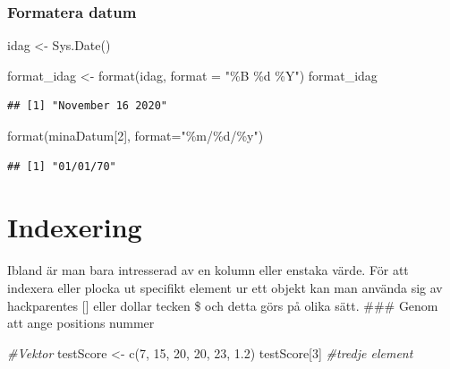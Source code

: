 \documentclass[
]{book}
\newenvironment{Shaded}{\begin{snugshade}}{\end{snugshade}}
\newcommand{\AttributeTok}[1]{\textcolor[rgb]{0.77,0.63,0.00}{#1}}
\newcommand{\CommentTok}[1]{\textcolor[rgb]{0.56,0.35,0.01}{\textit{#1}}}
\newcommand{\DecValTok}[1]{\textcolor[rgb]{0.00,0.00,0.81}{#1}}
\newcommand{\FloatTok}[1]{\textcolor[rgb]{0.00,0.00,0.81}{#1}}
\newcommand{\FunctionTok}[1]{\textcolor[rgb]{0.00,0.00,0.00}{#1}}
\newcommand{\NormalTok}[1]{#1}
\newcommand{\OtherTok}[1]{\textcolor[rgb]{0.56,0.35,0.01}{#1}}
\newcommand{\StringTok}[1]{\textcolor[rgb]{0.31,0.60,0.02}{#1}}
\begin{document}
\hypertarget{formatera-datum}{%
\subsubsection{Formatera datum}\label{formatera-datum}}

\begin{Shaded}
\begin{Highlighting}[]
\NormalTok{idag }\OtherTok{\textless{}{-}} \FunctionTok{Sys.Date}\NormalTok{()}

\NormalTok{format\_idag }\OtherTok{\textless{}{-}} \FunctionTok{format}\NormalTok{(idag, }\AttributeTok{format =} \StringTok{"\%B \%d \%Y"}\NormalTok{)}
\NormalTok{format\_idag}
\end{Highlighting}
\end{Shaded}

\begin{verbatim}
## [1] "November 16 2020"
\end{verbatim}

\begin{Shaded}
\begin{Highlighting}[]
\FunctionTok{format}\NormalTok{(minaDatum[}\DecValTok{2}\NormalTok{], }\AttributeTok{format=}\StringTok{"\%m/\%d/\%y"}\NormalTok{)}
\end{Highlighting}
\end{Shaded}

\begin{verbatim}
## [1] "01/01/70"
\end{verbatim}

\hypertarget{indexering}{%
\section{Indexering}\label{indexering}}

Ibland är man bara intresserad av en kolumn eller enstaka värde. För att indexera eller plocka ut specifikt element ur ett objekt kan man använda sig av hackparentes {[}{]} eller dollar tecken \$ och detta görs på olika sätt.
\#\#\# Genom att ange positions nummer

\begin{Shaded}
\begin{Highlighting}[]
\CommentTok{\#Vektor}
\NormalTok{testScore }\OtherTok{\textless{}{-}} \FunctionTok{c}\NormalTok{(}\DecValTok{7}\NormalTok{, }\DecValTok{15}\NormalTok{, }\DecValTok{20}\NormalTok{, }\DecValTok{20}\NormalTok{, }\DecValTok{23}\NormalTok{, }\FloatTok{1.2}\NormalTok{)}
\NormalTok{testScore[}\DecValTok{3}\NormalTok{] }\CommentTok{\#tredje element}
\end{Highlighting}
\end{Shaded}
\end{document}
